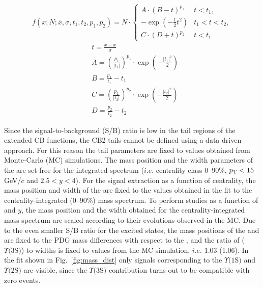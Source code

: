\begin{equation}\label{eqn:CB2}
f(x;N;\bar{x},\sigma,t_1,t_2,p_1,p_2) = N\cdot\begin{cases} A\cdot(B-t)^{p_1} & t<t_1,\\ -\exp\left(-\frac{1}{2}t^2\right) & t_1<t<t_2,\\C\cdot(D+t)^{p_2} & t<t_1\end{cases}
\end{equation}
\begin{equation}\label{eqn:CB2def}
\begin{aligned}
&t=\frac{x-\bar{x}}{\sigma}
\\&A=\left(\frac{p_1}{|t_1|}\right)^{p_1}\cdot\exp\left(-\frac{|t_1|^2}{2}\right)
\\&B=\frac{p_1}{t_1} - t_1
\\&C=\left(\frac{p_2}{|t_2|}\right)^{p_2}\cdot\exp\left(-\frac{|t_2|^2}{2}\right)
\\&D=\frac{p_2}{t_2} - t_2
\end{aligned}
\end{equation}

Since the signal-to-background (S/B) ratio is low in the tail regions of the extended CB functions, the CB2 tails cannot be defined using a data driven approach.
For this reason the tail parameters are fixed to values obtained from Monte-Carlo (MC) simulations. 
The mass position and the width parameters of the \upsis are set free for the integrated spectrum ($i.e.$ centrality class 0--90\%, $p_{\rm T}<15$ GeV/$c$ and $2.5 < y < 4$).
For the signal extraction as a function of centrality, the mass position  and width of the \upsis are fixed to the values obtained in the fit to the centrality-integrated (0--90\%) mass spectrum. 
To perform studies as a function of \pt and $y$, the mass position and the width obtained for the centrality-integrated mass spectrum are scaled according to their evolutions observed in the MC.
Due to the even smaller S/B ratio for the excited states, the mass positions of the \upsiss and \upsisss are fixed to the PDG \cite{Patrignani:2016xqp} mass differences with respect to the \upsis, and the ratio of \upsiss ($\Upsilon\text{(3S)}$) to \upsis widths is fixed to values from the MC simulation, $i.e.$ 1.03 (1.06). 
In the fit shown in Fig.~\ref{fig:mass_dist} only signals corresponding to the $\Upsilon\text{(1S)}$ and $\Upsilon\text{(2S)}$ are visible, since the $\Upsilon\text{(3S)}$ contribution turns out to be compatible with zero events.
 
